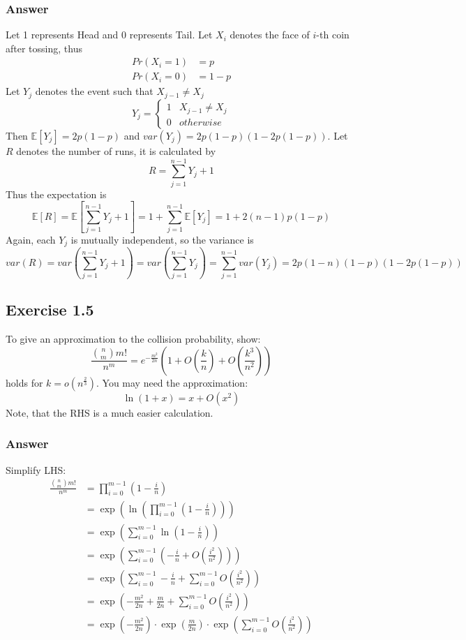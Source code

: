 \documentclass[a4paper]{article}
\newcommand{\Expected}[1]{\mathbb{E}[#1]}
\begin{document}
\subsubsection{Answer}

Let 1 represents Head and 0 represents Tail. Let $X_i$ denotes the face of $i$-th coin after tossing, thus
\begin{equation*}
\begin{split}
Pr(X_i=1) & = p \\
Pr(X_i=0) & = 1-p
\end{split}
\end{equation*}
Let $Y_j$ denotes the event such that $X_{j-1} \neq X_j$
\[
Y_j =
\begin{cases}
1 & X_{j-1} \neq X_j \\
0 & otherwise
\end{cases}
\]
Then $\Expected{Y_j} = 2p(1-p)$ and $var(Y_j) = 2p(1-p)(1-2p(1-p))$. Let $R$ denotes the number of runs, it is calculated by
$$R = \sum_{j=1}^{n-1}Y_j+1$$
Thus the expectation is
$$\Expected{R} = \Expected{\sum_{j=1}^{n-1}Y_j+1} = 1+\sum_{j=1}^{n-1}\Expected{Y_j} = 1 + 2(n-1)p(1-p)$$
Again, each $Y_j$ is mutually independent, so the variance is
$$var(R) = var(\sum_{j=1}^{n-1}Y_j+1) = var(\sum_{j=1}^{n-1}Y_j) = \sum_{j=1}^{n-1}var(Y_j) = 2p(1-n)(1-p)(1-2p(1-p))$$

\subsection{Exercise 1.5}

To give an approximation to the collision probability, show:
$$\frac{\binom{n}{m}m!}{n^m} = e^{-\frac{m^2}{2n}}(1+O(\frac{k}{n})+O(\frac{k^3}{n^2}))$$
holds for $k = o(n^\frac{2}{3})$. You may need the approximation:
$$\ln{(1+x)} = x+O(x^2)$$
Note, that the RHS is a much easier calculation.

\subsubsection{Answer}

Simplify LHS:
\begin{equation*}
\begin{split}
\frac{\binom{n}{m}m!}{n^m} & = \prod_{i=0}^{m-1}(1-\frac{i}{n}) \\
& = \exp{(\ln{(\prod_{i=0}^{m-1}(1-\frac{i}{n}))})} \\
& = \exp{(\sum_{i=0}^{m-1}\ln{(1-\frac{i}{n})})} \\
& = \exp{(\sum_{i=0}^{m-1}(-\frac{i}{n}+O(\frac{i^2}{n^2})))} \\
& = \exp{(\sum_{i=0}^{m-1}-\frac{i}{n}+\sum_{i=0}^{m-1}O(\frac{i^2}{n^2}))} \\
& = \exp{(-\frac{m^2}{2n}+\frac{m}{2n}+\sum_{i=0}^{m-1}O(\frac{i^2}{n^2}))} \\
& = \exp{(-\frac{m^2}{2n})} \cdot \exp{(\frac{m}{2n})} \cdot \exp{(\sum_{i=0}^{m-1}O(\frac{i^2}{n^2}))}
\end{split}
\end{equation*}
\end{document}
